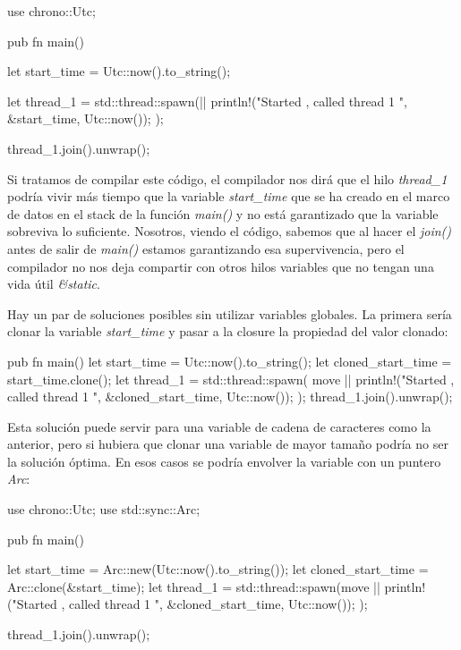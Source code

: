 \begin{Codigo}
   use chrono::Utc;
   
   pub fn main() {
      let start_time = Utc::now().to_string();
      
      let thread_1 = std::thread::spawn(||{
         println!("Started {}, called thread 1 {}", &start_time, Utc::now());
      });
      
      thread_1.join().unwrap();
   }
\end{Codigo}

Si tratamos de compilar este código, el compilador nos dirá que el hilo \textit{thread\_1} podría vivir más tiempo que la variable \textit{start\_time} que se ha creado en el marco de datos en el stack de la función \textit{main()} y no está garantizado que la variable sobreviva lo suficiente. Nosotros, viendo el código, sabemos que al hacer el \textit{join()} antes de salir de \textit{main()} estamos garantizando esa supervivencia, pero el compilador no nos deja compartir con otros hilos variables que no tengan una vida útil \textit{\&static}.

Hay un par de soluciones posibles sin utilizar variables globales. La primera sería clonar la variable \textit{start\_time} y pasar a la closure la propiedad del valor clonado:

\begin{Codigo}
   pub fn main() {
      let start_time = Utc::now().to_string();
      let cloned_start_time = start_time.clone();
      let thread_1 = std::thread::spawn( move ||{
         println!("Started {}, called thread 1 {}", &cloned_start_time, Utc::now());
      });
      thread_1.join().unwrap();
   }	
\end{Codigo}

Esta solución puede servir para una variable de cadena de caracteres como la anterior, pero si hubiera que clonar una variable de mayor tamaño podría no ser la solución óptima. En esos casos se podría envolver la variable con un puntero \textit{Arc}:



\begin{Codigo}
   use chrono::Utc;
   use std::sync::Arc;
   
   pub fn main() {
      let start_time = Arc::new(Utc::now().to_string());
      let cloned_start_time = Arc::clone(&start_time);
      let thread_1 = std::thread::spawn(move ||{
         println!("Started {}, called thread 1 {}", &cloned_start_time, Utc::now());
      });
      
      thread_1.join().unwrap();
   }
\end{Codigo}

